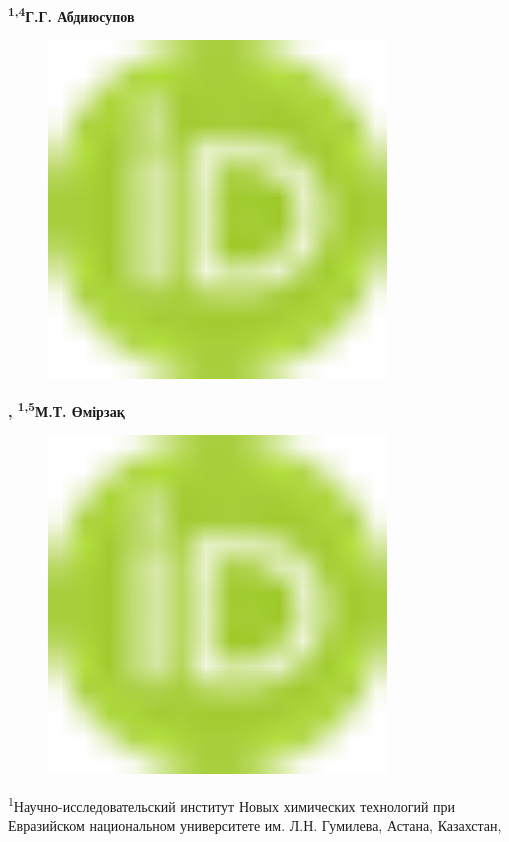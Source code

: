 {\bfseries \textsuperscript{1,4}Г.Г.
Абдиюсупов}
\begin{figure}[H]
	\centering
	\includegraphics[width=0.8\textwidth]{media/chem2/image1}
	\caption*{}
\end{figure}
{\bfseries ,
\textsuperscript{1,5}М.Т.
Өмірзақ}
\begin{figure}[H]
	\centering
	\includegraphics[width=0.8\textwidth]{media/chem2/image1}
	\caption*{}
\end{figure}


\textsuperscript{1}Научно-исследовательский институт Новых химических
технологий при Евразийском национальном университете им. Л.Н. Гумилева,
Астана, Казахстан,

